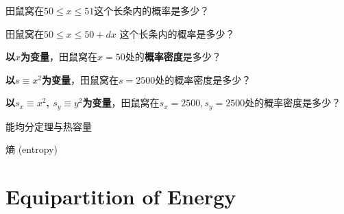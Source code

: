 \documentclass[CJK]{beamer}
\begin{document}
\begin{frame}
\bch


田鼠窝在$50\le x\le 51$这个长条内的概率是多少？

\ech
\end{frame}


\begin{frame}
\bch


田鼠窝在$50\le x\le 50 + dx$ 这个长条内的概率是多少？

\ech
\end{frame}


\begin{frame}
\bch


{\bf 以$x$为变量}，田鼠窝在$x=50$处的{\bf 概率密度}是多少？

\ech
\end{frame}


\begin{frame}
\bch


{\bf 以$s\equiv x^2$为变量}，田鼠窝在$s=2500$处的概率密度是多少？

\ech
\end{frame}

\begin{frame}
\bch


{\bf 以$s_x\equiv x^2$, $s_y \equiv y^2$为变量}，田鼠窝在$s_x=2500, s_y=2500$处的概率密度是多少？

\ech
\end{frame}


\begin{frame}
\bch
\bitem
\item{能均分定理与热容量}
\item{熵 (entropy)}
\eitem
\ech
\end{frame}




\section{Equipartition of Energy}
\end{document}
